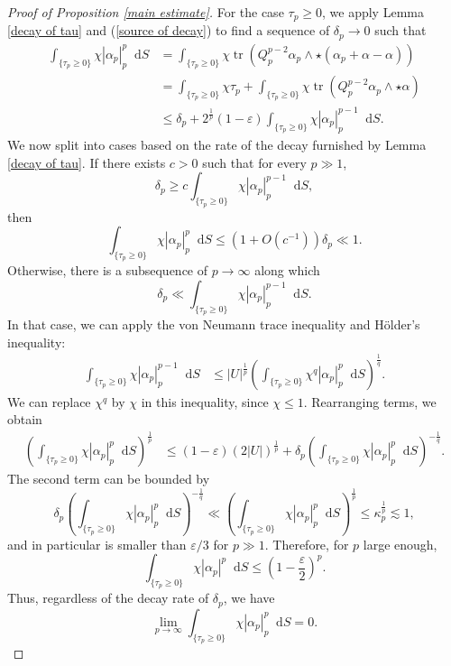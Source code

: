 \documentclass[reqno,11pt]{amsart}
\newcommand*\dif{\mathop{}\!\mathrm{d}}
\DeclareMathOperator{\tr}{tr}
\theoremstyle{definition}
\numberwithin{equation}{section}
\begin{document}
\begin{proof}[Proof of Proposition \ref{main estimate}]
For the case $\tau_p \geq 0$, we apply Lemma \ref{decay of tau} and (\ref{source of decay}) to find a sequence of $\delta_p \to 0$ such that
\begin{align*}
\int_{\{\tau_p \geq 0\}} \chi |\alpha_p|_p^p \dif S
&= \int_{\{\tau_p \geq 0\}} \chi \tr(Q_p^{p - 2} \alpha_p \wedge \star (\alpha_p + \alpha - \alpha)) \\
&= \int_{\{\tau_p \geq 0\}} \chi \tau_p + \int_{\{\tau_p \geq 0\}} \chi \tr(Q_p^{p - 2} \alpha_p \wedge \star \alpha) \\
&\leq \delta_p + 2^{\frac{1}{p}} (1 - \varepsilon) \int_{\{\tau_p \geq 0\}} \chi |\alpha_p|_p^{p - 1} \dif S.
\end{align*}
We now split into cases based on the rate of the decay furnished by Lemma \ref{decay of tau}.
If there exists $c > 0$ such that for every $p \gg 1$,
$$\delta_p \geq c\int_{\{\tau_p \geq 0\}} \chi |\alpha_p|_p^{p - 1} \dif S,$$
then 
$$\int_{\{\tau_p \geq 0\}} \chi |\alpha_p|_p^p \dif S \leq (1 + O(c^{-1})) \delta_p \ll 1.$$
Otherwise, there is a subsequence of $p \to \infty$ along which 
$$\delta_p \ll \int_{\{\tau_p \geq 0\}} \chi |\alpha_p|_p^{p - 1} \dif S.$$
In that case, we can apply the von Neumann trace inequality and H\"older's inequality:
\begin{align*}
\int_{\{\tau_p \geq 0\}} \chi |\alpha_p|_p^{p - 1} \dif S
&\leq |U|^{\frac{1}{p}} \left(\int_{\{\tau_p \geq 0\}} \chi^q |\alpha_p|_p^p \dif S\right)^{\frac{1}{q}}.
\end{align*}
We can replace $\chi^q$ by $\chi$ in this inequality, since $\chi \leq 1$.
Rearranging terms, we obtain
\begin{align*}
\left(\int_{\{\tau_p \geq 0\}} \chi |\alpha_p|_p^p \dif S\right)^{\frac{1}{p}} 
&\leq (1 - \varepsilon) (2|U|)^{\frac{1}{p}} + \delta_p \left(\int_{\{\tau_p \geq 0\}} \chi |\alpha_p|_p^p \dif S\right)^{-\frac{1}{q}}.
\end{align*}
The second term can be bounded by
$$\delta_p \left(\int_{\{\tau_p \geq 0\}} \chi |\alpha_p|_p^p \dif S\right)^{-\frac{1}{q}} \ll \left(\int_{\{\tau_p \geq 0\}} \chi |\alpha_p|_p^p \dif S\right)^{\frac{1}{p}} \leq \kappa_p^{\frac{1}{p}} \lesssim 1,$$
and in particular is smaller than $\varepsilon/3$ for $p \gg 1$.
Therefore, for $p$ large enough,
$$\int_{\{\tau_p \geq 0\}} \chi |\alpha_p|^p \dif S \leq \left(1 - \frac{\varepsilon}{2}\right)^p.$$
Thus, regardless of the decay rate of $\delta_p$, we have 
\begin{equation}\label{decay on positive}
\lim_{p \to \infty} \int_{\{\tau_p \geq 0\}} \chi |\alpha_p|_p^p \dif S = 0.
\end{equation}


\end{proof}
\end{document}
